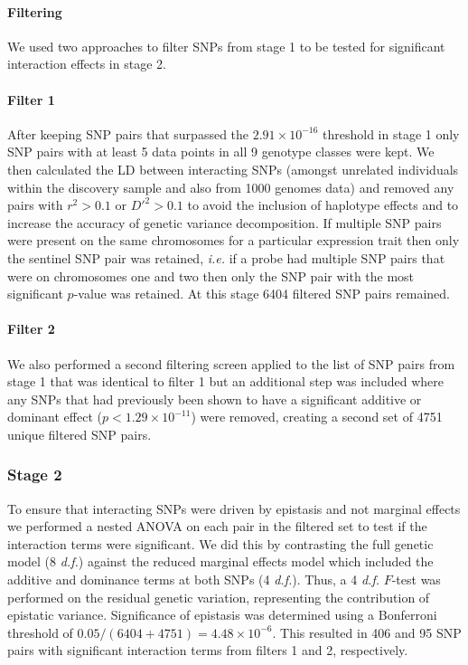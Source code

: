 \documentclass[paper=a4, fontsize=11pt]{scrartcl}					%
\numberwithin{equation}{section}									%
\numberwithin{figure}{section}										%
\numberwithin{table}{section}										%
\begin{document}
\paragraph{Filtering} We used two approaches to filter SNPs from stage 1 to be tested for significant interaction effects in stage 2.

\paragraph{Filter 1} After keeping SNP pairs that surpassed the $2.91 \times 10^{-16}$ threshold in stage 1 only SNP pairs with at least 5 data points in all 9 genotype classes were kept. We then calculated the LD between interacting SNPs (amongst unrelated individuals within the discovery sample and also from 1000 genomes data) and removed any pairs with $r^2 > 0.1$ or $D'^{2} > 0.1$ to avoid the inclusion of haplotype effects and to increase the accuracy of genetic variance decomposition. If multiple SNP pairs were present on the same chromosomes for a particular expression trait then only the sentinel SNP pair was retained, \emph{i.e.} if a probe had multiple SNP pairs that were on chromosomes one and two then only the SNP pair with the most significant $p$-value was retained. At this stage 6404 filtered SNP pairs remained. 

\paragraph{Filter 2} We also performed a second filtering screen applied to the list of SNP pairs from stage 1 that was identical to filter 1 but an additional step was included where any SNPs that had previously been shown to have a significant additive or dominant effect ($p < 1.29 \times 10^{-11}$) were removed, creating a second set of 4751 unique filtered SNP pairs.

\subsubsection*{Stage 2}

To ensure that interacting SNPs were driven by epistasis and not marginal effects we performed a nested ANOVA on each pair in the filtered set to test if the interaction terms were significant. We did this by contrasting the full genetic model (8 \emph{d.f.}) against the reduced marginal effects model which included the additive and dominance terms at both SNPs (4 \emph{d.f.}). Thus, a 4 \emph{d.f.} $F$-test was performed on the residual genetic variation, representing the contribution of epistatic variance. Significance of epistasis was determined using a Bonferroni threshold of $0.05 / (6404+4751) = 4.48 \times 10^{-6}$. This resulted in 406 and 95 SNP pairs with significant interaction terms from filters 1 and 2, respectively.
\end{document}
